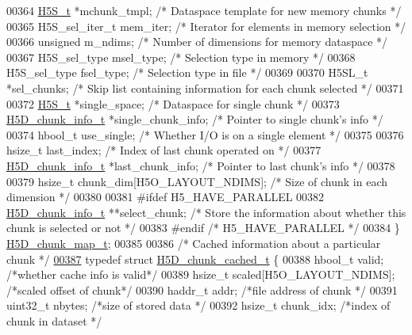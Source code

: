 \begin{DoxyCode}
00364     \hyperlink{struct_h5_s__t}{H5S\_t} *mchunk\_tmpl;         \textcolor{comment}{/* Dataspace template for new memory chunks */}
00365     H5S\_sel\_iter\_t mem\_iter;    \textcolor{comment}{/* Iterator for elements in memory selection */}
00366     \textcolor{keywordtype}{unsigned} m\_ndims;           \textcolor{comment}{/* Number of dimensions for memory dataspace */}
00367     H5S\_sel\_type msel\_type;     \textcolor{comment}{/* Selection type in memory */}
00368     H5S\_sel\_type fsel\_type;     \textcolor{comment}{/* Selection type in file */}
00369 
00370     H5SL\_t *sel\_chunks;         \textcolor{comment}{/* Skip list containing information for each chunk selected */}
00371 
00372     \hyperlink{struct_h5_s__t}{H5S\_t}  *single\_space;       \textcolor{comment}{/* Dataspace for single chunk */}
00373     \hyperlink{struct_h5_d__chunk__info__t}{H5D\_chunk\_info\_t} *single\_chunk\_info;  \textcolor{comment}{/* Pointer to single chunk's info */}
00374     hbool\_t use\_single;         \textcolor{comment}{/* Whether I/O is on a single element */}
00375 
00376     hsize\_t last\_index;         \textcolor{comment}{/* Index of last chunk operated on */}
00377     \hyperlink{struct_h5_d__chunk__info__t}{H5D\_chunk\_info\_t} *last\_chunk\_info;  \textcolor{comment}{/* Pointer to last chunk's info */}
00378 
00379     hsize\_t chunk\_dim[H5O\_LAYOUT\_NDIMS];    \textcolor{comment}{/* Size of chunk in each dimension */}
00380 
00381 \textcolor{preprocessor}{#ifdef H5\_HAVE\_PARALLEL}
00382     \hyperlink{struct_h5_d__chunk__info__t}{H5D\_chunk\_info\_t} **select\_chunk;    \textcolor{comment}{/* Store the information about whether this chunk
       is selected or not */}
00383 \textcolor{preprocessor}{#endif }\textcolor{comment}{/* H5\_HAVE\_PARALLEL */}\textcolor{preprocessor}{}
00384 \} \hyperlink{struct_h5_d__chunk__map__t}{H5D\_chunk\_map\_t};
00385 
00386 \textcolor{comment}{/* Cached information about a particular chunk */}
\hyperlink{struct_h5_d__chunk__cached__t}{00387} \textcolor{keyword}{typedef} \textcolor{keyword}{struct }\hyperlink{struct_h5_d__chunk__cached__t}{H5D\_chunk\_cached\_t} \{
00388     hbool\_t     valid;                          \textcolor{comment}{/*whether cache info is valid*/}
00389     hsize\_t scaled[H5O\_LAYOUT\_NDIMS];   \textcolor{comment}{/*scaled offset of chunk*/}
00390     haddr\_t addr;               \textcolor{comment}{/*file address of chunk */}
00391     uint32\_t    nbytes;             \textcolor{comment}{/*size of stored data   */}
00392     hsize\_t     chunk\_idx;          \textcolor{comment}{/*index of chunk in dataset */}

\end{DoxyCode}
